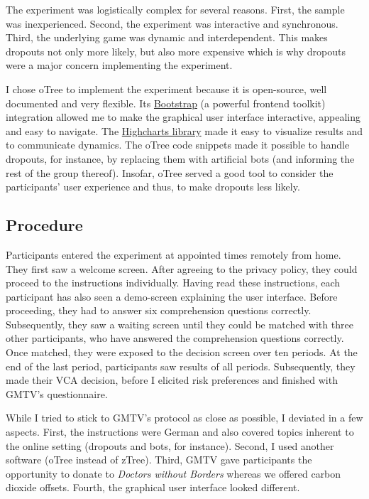 \documentclass[
  authoryear,
  preprint,
  3p]{elsarticle}
\begin{document}
The experiment was logistically complex for several reasons. First, the
sample was inexperienced. Second, the experiment was interactive and
synchronous. Third, the underlying game was dynamic and interdependent.
This makes dropouts not only more likely, but also more expensive which
is why dropouts were a major concern implementing the experiment.

I chose oTree \citep{oTree} to implement the experiment because it is
open-source, well documented and very flexible. Its
\href{https://getbootstrap.com/}{Bootstrap} (a powerful frontend
toolkit) integration allowed me to make the graphical user interface
interactive, appealing and easy to navigate. The
\href{https://www.highcharts.com/}{Highcharts library} made it easy to
visualize results and to communicate dynamics. The oTree code snippets
made it possible to handle dropouts, for instance, by replacing them
with artificial bots (and informing the rest of the group thereof).
Insofar, oTree served a good tool to consider the participants' user
experience and thus, to make dropouts less likely.

\hypertarget{sec-procedure}{%
\subsection{Procedure}\label{sec-procedure}}

Participants entered the experiment at appointed times remotely from
home. They first saw a welcome screen. After agreeing to the privacy
policy, they could proceed to the instructions individually. Having read
these instructions, each participant has also seen a demo-screen
explaining the user interface. Before proceeding, they had to answer six
comprehension questions correctly. Subsequently, they saw a waiting
screen until they could be matched with three other participants, who
have answered the comprehension questions correctly. Once matched, they
were exposed to the decision screen over ten periods. At the end of the
last period, participants saw results of all periods. Subsequently, they
made their VCA decision, before I elicited risk preferences
\citep{HoltLaury2002} and finished with GMTV's questionnaire.

While I tried to stick to GMTV's protocol as close as possible, I
deviated in a few aspects. First, the instructions were German and also
covered topics inherent to the online setting (dropouts and bots, for
instance). Second, I used another software (oTree instead of zTree).
Third, GMTV gave participants the opportunity to donate to \emph{Doctors
without Borders} whereas we offered carbon dioxide offsets. Fourth, the
graphical user interface looked different.
\end{document}
